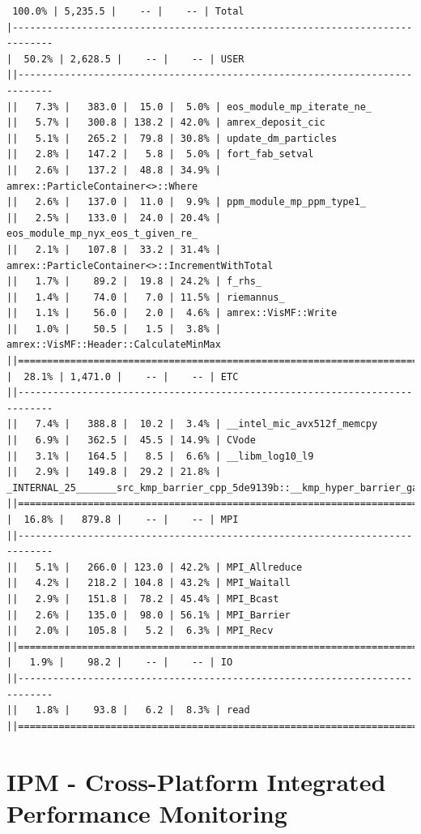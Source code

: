 \begin{enumerate}
\begin{verbatim}
 100.0% | 5,235.5 |    -- |    -- | Total
|-----------------------------------------------------------------------------
|  50.2% | 2,628.5 |    -- |    -- | USER
||----------------------------------------------------------------------------
||   7.3% |   383.0 |  15.0 |  5.0% | eos_module_mp_iterate_ne_
||   5.7% |   300.8 | 138.2 | 42.0% | amrex_deposit_cic
||   5.1% |   265.2 |  79.8 | 30.8% | update_dm_particles
||   2.8% |   147.2 |   5.8 |  5.0% | fort_fab_setval
||   2.6% |   137.2 |  48.8 | 34.9% | amrex::ParticleContainer<>::Where
||   2.6% |   137.0 |  11.0 |  9.9% | ppm_module_mp_ppm_type1_
||   2.5% |   133.0 |  24.0 | 20.4% | eos_module_mp_nyx_eos_t_given_re_
||   2.1% |   107.8 |  33.2 | 31.4% | amrex::ParticleContainer<>::IncrementWithTotal
||   1.7% |    89.2 |  19.8 | 24.2% | f_rhs_
||   1.4% |    74.0 |   7.0 | 11.5% | riemannus_
||   1.1% |    56.0 |   2.0 |  4.6% | amrex::VisMF::Write
||   1.0% |    50.5 |   1.5 |  3.8% | amrex::VisMF::Header::CalculateMinMax
||============================================================================
|  28.1% | 1,471.0 |    -- |    -- | ETC
||----------------------------------------------------------------------------
||   7.4% |   388.8 |  10.2 |  3.4% | __intel_mic_avx512f_memcpy
||   6.9% |   362.5 |  45.5 | 14.9% | CVode
||   3.1% |   164.5 |   8.5 |  6.6% | __libm_log10_l9
||   2.9% |   149.8 |  29.2 | 21.8% | _INTERNAL_25_______src_kmp_barrier_cpp_5de9139b::__kmp_hyper_barrier_gather
||============================================================================
|  16.8% |   879.8 |    -- |    -- | MPI
||----------------------------------------------------------------------------
||   5.1% |   266.0 | 123.0 | 42.2% | MPI_Allreduce
||   4.2% |   218.2 | 104.8 | 43.2% | MPI_Waitall
||   2.9% |   151.8 |  78.2 | 45.4% | MPI_Bcast
||   2.6% |   135.0 |  98.0 | 56.1% | MPI_Barrier
||   2.0% |   105.8 |   5.2 |  6.3% | MPI_Recv
||============================================================================
|   1.9% |    98.2 |    -- |    -- | IO
||----------------------------------------------------------------------------
||   1.8% |    93.8 |   6.2 |  8.3% | read
||============================================================================
\end{verbatim}


\end{enumerate}

\section{IPM - Cross-Platform Integrated Performance Monitoring}

